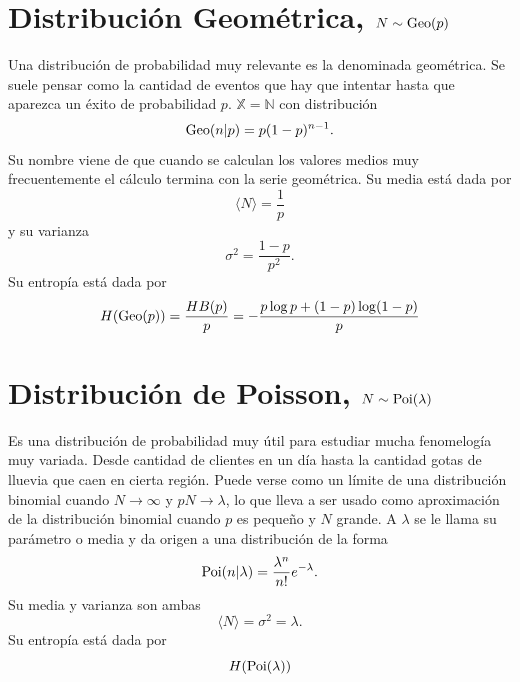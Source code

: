 \section{Distribuci\'on Geom\'etrica, $N\sim \text{Geo}(p)$}
Una distribuci\'on de probabilidad muy relevante es la denominada geom\'etrica. Se suele pensar como la cantidad de eventos que hay que intentar hasta que aparezca un \'exito de probabilidad $p$. $\mathbb{X}=\mathbb{N}$ con distribuci\'on
\begin{equation}
    \text{Geo}(n|p) = p(1-p)^{n-1}.
\end{equation}
Su nombre viene de que cuando se calculan los valores medios muy frecuentemente el c\'alculo termina con la serie geom\'etrica. Su media est\'a dada por
\begin{equation}
    \langle N\rangle = \frac{1}{p} 
\end{equation}
y su varianza
\begin{equation}
    \sigma^2 = \frac{1-p}{p^2}.
\end{equation}
Su entrop\'ia est\'a dada por
\begin{equation}
    H(\text{Geo}(p)) = \frac{HB(p)}{p}= -\frac{p\log p + (1-p)\log(1-p)}{p}
\end{equation}
\section{Distribuci\'on de Poisson, $N\sim \text{Poi}(\lambda)$}
Es una distribuci\'on de probabilidad muy \'util para estudiar mucha fenomelog\'ia muy variada. Desde cantidad de clientes en un d\'ia hasta la cantidad gotas de lluevia que caen en cierta regi\'on. Puede verse como un l\'imite de una distribuci\'on binomial cuando $N\to\infty$ y $pN\to \lambda$, lo que lleva a ser usado como aproximaci\'on de la distribuci\'on binomial cuando $p$ es pequeño y $N$ grande. A $\lambda$ se le llama su par\'ametro o media y da origen a una distribuci\'on de la forma
\begin{equation}
    \text{Poi}(n|\lambda) = \frac{\lambda^n}{n!}e^{-\lambda}.
\end{equation}
Su media y varianza son ambas
\begin{equation}
    \langle N\rangle = \sigma^2=\lambda.
\end{equation}
Su entrop\'ia est\'a dada por 
\begin{equation}
    H(\text{Poi}(\lambda))
\end{equation}